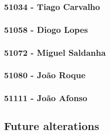 \documentclass[oneside]{article}
\begin{document}
      \subsubsection{51034 - Tiago Carvalho}
      \subsubsection{51058 - Diogo Lopes}
      \subsubsection{51072 - Miguel Saldanha}
      \subsubsection{51080 - João Roque}
      \subsubsection{51111 - João Afonso}

    \subsection{Future alterations}
    \label{sec:alterations}
\end{document}
